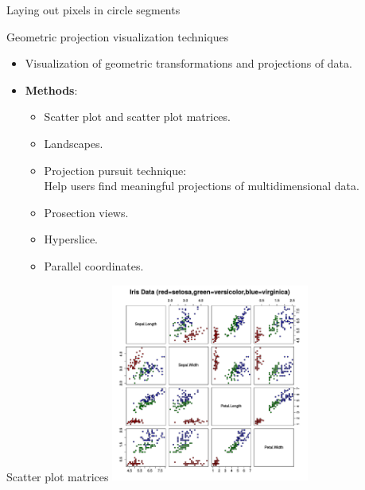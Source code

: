 \documentclass[aspectratio=169,t]{beamer}
\begin{document}
{\begin{frame}{Laying out pixels in circle segments}
    \end{frame}
  }

  { 
    \begin{frame}{Geometric projection visualization techniques}
    \begin{itemize}
      \item Visualization of geometric transformations and projections of data.
      \item \textbf{Methods}:
      \begin{itemize}
          \item Scatter plot and scatter plot matrices.
          \item Landscapes.
          \item Projection pursuit technique:\\
                \small{Help users find meaningful projections of multidimensional data.}
          \item Prosection views.
          \item Hyperslice.
          \item Parallel coordinates.
      \end{itemize}
    \end{itemize}
    \end{frame}
  }

  { 
    \begin{frame}{Scatter plot matrices}
    \centering
    \includegraphics[height=6.5cm]{img/scatterplot_matrix.pdf}
    \end{frame}
  }
\end{document}
